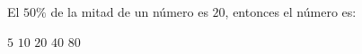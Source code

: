 \documentclass[sin nombre]{srs}
\begin{document}
\begin{preguntas}[after-item-skip=2cm]
\pregunta El $50\%$ de la mitad de un número es $20$, entonces el número es:
\begin{vertical}
\alternativa $5$
\alternativa $10$
\alternativa $20$
\alternativa $40$
\alternativa $80$
\end{vertical}

\end{preguntas}
\end{document}

